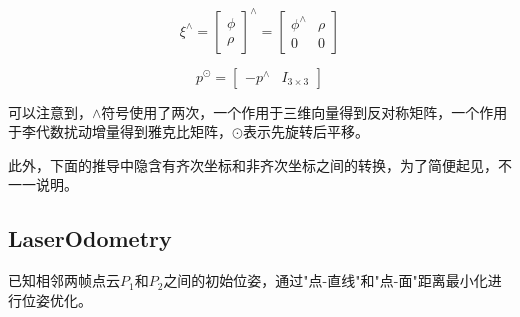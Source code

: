 \documentclass{ctexart}
\begin{document}
	\begin{equation}
	\xi^\wedge
	=\begin{bmatrix}
	\phi \\ \rho
	\end{bmatrix}^\wedge
	=\begin{bmatrix}
	\phi^\wedge & \rho \\
	0 & 0
	\end{bmatrix}
	\end{equation}

	\begin{equation}
	p^\odot=\begin{bmatrix}
	-p^\wedge & I_{3\times3}
	\end{bmatrix}
	\end{equation}
	
	\par 可以注意到，$\wedge$符号使用了两次，一个作用于三维向量得到反对称矩阵，一个作用于李代数扰动增量得到雅克比矩阵，$\odot$表示先旋转后平移。
	\par 此外，下面的推导中隐含有齐次坐标和非齐次坐标之间的转换，为了简便起见，不一一说明。
	
	\subsection{LaserOdometry}
	已知相邻两帧点云$P_1$和$P_2$之间的初始位姿，通过"点-直线"和"点-面"距离最小化进行位姿优化。
\end{document}
